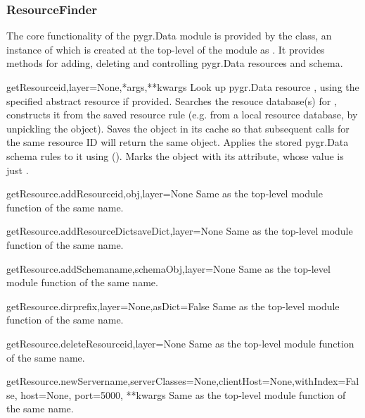 \documentclass{howto}
\begin{document}
\subsubsection{ResourceFinder}
The core functionality of the pygr.Data module is provided by the
 class, an instance of which is created at the
top-level of the module as .  It 
provides methods for adding, deleting and controlling pygr.Data
resources and schema.

\begin{funcdesc}{getResource}{id,layer=None,*args,**kwargs}
  Look up pygr.Data resource , using the specified abstract
  resource  if provided.  Searches the resouce database(s)
  for , constructs it from the saved resource rule (e.g. from
  a local resource database, by unpickling the object).  Saves the 
  object in its cache so that subsequent calls for the same resource
  ID will return the same object.  Applies the stored pygr.Data schema
  rules to it using ().  Marks the object with
  its  attribute, whose value is just .
\end{funcdesc}

\begin{funcdesc}{getResource.addResource}{id,obj,layer=None}
  Same as the top-level module function of the same name.
\end{funcdesc}

\begin{funcdesc}{getResource.addResourceDict}{saveDict,layer=None}
  Same as the top-level module function of the same name.
\end{funcdesc}

\begin{funcdesc}{getResource.addSchema}{name,schemaObj,layer=None}
  Same as the top-level module function of the same name.
\end{funcdesc}

\begin{funcdesc}{getResource.dir}{prefix,layer=None,asDict=False}
  Same as the top-level module function of the same name.
\end{funcdesc}

\begin{funcdesc}{getResource.deleteResource}{id,layer=None}
  Same as the top-level module function of the same name.
\end{funcdesc}

\begin{funcdesc}{getResource.newServer}{name,serverClasses=None,clientHost=None,withIndex=False, host=None, port=5000, **kwargs}
  Same as the top-level module function of the same name.
\end{funcdesc}
\end{document}
